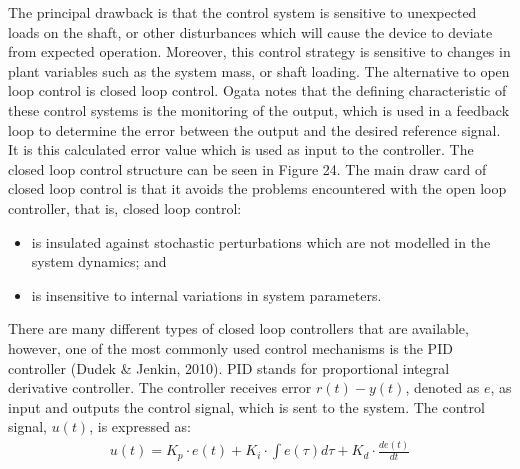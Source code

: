 \documentclass[a4paper]{article}
\begin{document}
The principal drawback is that the control system is sensitive to unexpected loads on the shaft, or other disturbances which will cause the device to deviate from expected operation. Moreover, this control strategy is sensitive to changes in plant variables such as the system mass, or shaft loading. The alternative to open loop control is closed loop control. Ogata notes that the defining characteristic of these control systems is the monitoring of the output, which is used in a feedback loop to determine the error between the output and the desired reference signal. It is this calculated error value which is used as input to the controller. The closed loop control structure can be seen in Figure 24. The main draw card of closed loop control is that it avoids the problems encountered with the open loop controller, that is, closed loop control:
\begin{itemize}
\item is insulated against stochastic perturbations which are not modelled in the system dynamics; and
\item is insensitive to internal variations in system parameters.
\end{itemize}

There are many different types of closed loop controllers that are available, however, one of the most commonly used control mechanisms is the PID controller (Dudek \& Jenkin, 2010). PID stands for proportional integral derivative controller. The controller receives error $r(t) - y(t)$, denoted as $e$, as input and outputs the control signal, which is sent to the system. The control signal, $u(t)$, is expressed as:
\begin{align*}
u(t)  = K_p \cdot e(t) + K_i \cdot \int e(\tau) d\tau + K_d \cdot \frac{d e(t)}{dt}
\end{align*}
\end{document}
